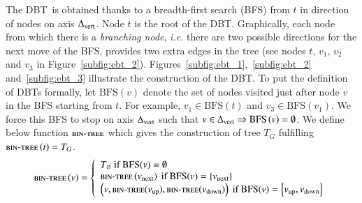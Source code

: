 \documentclass[preprint]{elsarticle}
\newcommand{\set}[1]{\left\{ #1 \right\}}
\newcommand{\deltavert}{\Delta_{\mbox{\scriptsize{vert}}}}
\newcommand{\bintree}{\textsc{bin-tree}}
\newcommand{\ebt}{DBT}
\newcommand{\bfs}{\mbox{BFS}}
\begin{document}
The \ebt ~is obtained thanks to a breadth-first search (BFS) from $t$ in direction of nodes on axis $\deltavert$. Node $t$ is the root of the \ebt . Graphically, each node from which there is a \textit{branching node}, {\em i.e.} there are two possible directions for the next move of the BFS, provides two extra edges in the tree (see nodes $t$, $v_1$, $v_2$ and $v_3$ in Figure~\ref{subfig:ebt_2}). Figures~\ref{subfig:ebt_1},~\ref{subfig:ebt_2} and~\ref{subfig:ebt_3} illustrate the construction of the \ebt . To put the definition of \ebt s formally, let $\bfs\left(v\right)$ denote the set of nodes visited just after node $v$ in the BFS starting from $t$. For example, $v_1 \in \bfs\left(t\right)$ and $v_3 \in \bfs\left(v_1\right)$. We force this BFS to stop on axis $\deltavert$ such that $v \in \deltavert \Rightarrow \bfs\left(v\right) = \emptyset$. We define below function $\bintree$ which gives the construction of tree $T_G$ fulfilling $\bintree \left(t\right) = T_G$.
\[
\bintree\left(v\right) = 
\left\{
\begin{array}{l}
T_\varnothing ~\mbox{if}~ \bfs(v) = \emptyset\\
\bintree\left(v_{\mbox{\scriptsize{next}}}\right)  ~\mbox{if}~ \bfs(v) = \set{v_{\mbox{\scriptsize{next}}}}\\
\left(v, \bintree(v_{\mbox{\scriptsize{up}}}), \bintree( v_{\mbox{\scriptsize{down}}})\right) ~\mbox{if}~ \bfs(v) = \set{v_{\mbox{\scriptsize{up}}},v_{\mbox{\scriptsize{down}}}}
\end{array}
\right.
\]

\end{document}
